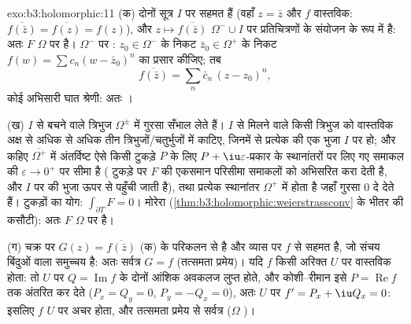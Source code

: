 \begin{solution}{exo:b3:holomorphic:11}
(क) दोनों सूत्र $I$ पर सहमत हैं (वहाँ $z = \bar z$ और $f$ वास्तविक:
$\overline{f(\bar z)} = \overline{f(z)} = f(z)$), और $z \mapsto \overline{f(\bar z)}$ $\Omega^-\cup I$ पर  प्रतिचित्रणों के संयोजन के रूप में
 है: अतः $F$ $\Omega$ पर  है। $\Omega^-$ पर : $z_0
\in \Omega^-$
के निकट $\bar z_0 \in \Omega^+$ के निकट $f(w) = \sum c_n(w - \bar z_0)^n$ का प्रसार कीजिए; तब
\[
\overline{f(\bar z)} = \sum_n\bar c_n\,(z - z_0)^n,
\]
कोई अभिसारी घात श्रेणी: अतः ।

(ख) $I$ से बचने वाले त्रिभुज $\Omega^\pm$ में गुरसा सँभाल लेते हैं। $I$
से मिलने वाले किसी त्रिभुज को वास्तविक अक्ष से अधिक से अधिक तीन
त्रिभुजों/चतुर्भुजों में काटिए, जिनमें से प्रत्येक की एक भुजा $I$
पर हो; और कहिए $\overline{\Omega^+}$ में अंतर्विष्ट ऐसे किसी टुकड़े $P$ के लिए  $P + \iu
\varepsilon$-प्रकार के स्थानांतरों पर लिए गए समाकल की $\varepsilon \to 0^+$ पर सीमा
है ( टुकड़े पर $F$ की एकसमान  परिसीमा समाकलों को अभिसरित
करा देती है, और $I$ पर की भुजा ऊपर से पहुँची जाती है), तथा प्रत्येक
स्थानांतर $\Omega^+$ में होता है जहाँ गुरसा $0$ दे देते हैं। टुकड़ों का
योग: $\int_{\partial T}F = 0$। मोरेरा (\cref{thm:b3:holomorphic:weierstrassconv} के भीतर की कसौटी): अतः $F$ $\Omega$ पर
 है।

(ग) चक्र पर $G(z) = \overline{f(\bar z)}$ (क) के परिकलन से  है और व्यास पर $f$
से सहमत है, जो संचय बिंदुओं वाला समुच्चय है: अतः सर्वत्र $G = f$
(तत्समता प्रमेय)। यदि $f$ किसी अरिक्त  $U$ पर
वास्तविक होता: तो $U$ पर $Q = \operatorname{Im}f$ के दोनों आंशिक अवकलज लुप्त होते,
और कोशी--रीमान इसे $P =
\operatorname{Re}f$ तक अंतरित कर देते ($P_x = Q_y = 0$, $P_y = -Q_x = 0$), अतः $U$
पर $f' = P_x + \iu Q_x = 0$: इसलिए $f$ $U$ पर अचर होता, और तत्समता प्रमेय से सर्वत्र
($\Omega$ )।
\end{solution}

